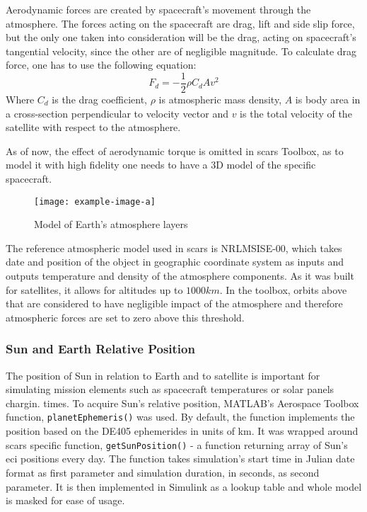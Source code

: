         Aerodynamic forces are created by spacecraft's movement through the atmosphere. The forces acting on the spacecraft are drag, lift and side slip force, but the only one taken into consideration will be the drag, acting on spacecraft's tangential velocity, since the other are of negligible magnitude. To calculate drag force, one has to use the following equation:
        \begin{equation}
            F_d = -\frac{1}{2}\rho C_d A v^2
        \end{equation}
        Where $C_d$ is the drag coefficient, $\rho$ is atmospheric mass density, $A$ is body area in a cross-section perpendicular to velocity vector and $v$ is the total velocity of the satellite with respect to the atmosphere.

        As of now, the effect of aerodynamic torque is omitted in \ac{scars} Toolbox, as to model it with high fidelity one needs to have a 3D model of the specific spacecraft.


        \begin{figure}[H]
            \centering
            \texttt{[image: example-image-a]}
            \caption{Model of Earth's atmosphere layers}
            \label{fig:atmosphere}
        \end{figure}

        The reference atmospheric model used in \ac{scars} is NRLMSISE-00, which takes date and position of the object in geographic coordinate system as inputs and outputs temperature and density of the atmosphere components. As it was built for satellites, it allows for altitudes up to $1000km$. In the toolbox, orbits above that are considered to have negligible impact of the atmosphere and therefore atmospheric forces are set to zero above this threshold.

    \subsubsection{Sun and Earth Relative Position}
        The position of Sun in relation to Earth and to satellite is important for simulating mission elements such as spacecraft temperatures or solar panels chargin. times. To acquire Sun's relative position, MATLAB's Aerospace Toolbox function, \verb|planetEphemeris()| was used. By default, the function implements the position based on the DE405 ephemerides in units of km. It was wrapped around \ac{scars} specific function, \verb|getSunPosition()| - a function returning array of Sun's \ac{eci} positions every day. The function takes simulation's start time in Julian date format as first parameter and simulation duration, in seconds, as second parameter. It is then implemented in Simulink as a lookup table and whole model is masked for ease of usage.

